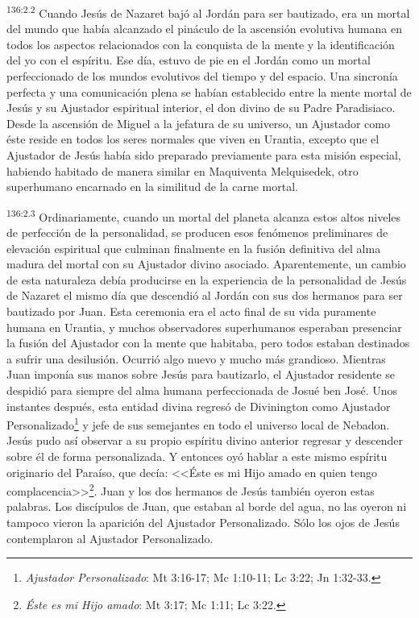 \par 
\textsuperscript{136:2.2} Cuando Jesús de Nazaret bajó al Jordán para ser bautizado, era un mortal del mundo que había alcanzado el pináculo de la ascensión evolutiva humana en todos los aspectos relacionados con la conquista de la mente y la identificación del yo con el espíritu. Ese día, estuvo de pie en el Jordán como un mortal perfeccionado de los mundos evolutivos del tiempo y del espacio. Una sincronía perfecta y una comunicación plena se habían establecido entre la mente mortal de Jesús y su Ajustador espiritual interior, el don divino de su Padre Paradisiaco. Desde la ascensión de Miguel a la jefatura de su universo, un Ajustador como éste reside en todos los seres normales que viven en Urantia, excepto que el Ajustador de Jesús había sido preparado previamente para esta misión especial, habiendo habitado de manera similar en Maquiventa Melquisedek, otro superhumano encarnado en la similitud de la carne mortal.

\par 
\textsuperscript{136:2.3} Ordinariamente, cuando un mortal del planeta alcanza estos altos niveles de perfección de la personalidad, se producen esos fenómenos preliminares de elevación espiritual que culminan finalmente en la fusión definitiva del alma madura del mortal con su Ajustador divino asociado. Aparentemente, un cambio de esta naturaleza debía producirse en la experiencia de la personalidad de Jesús de Nazaret el mismo día que descendió al Jordán con sus dos hermanos para ser bautizado por Juan. Esta ceremonia era el acto final de su vida puramente humana en Urantia, y muchos observadores superhumanos esperaban presenciar la fusión del Ajustador con la mente que habitaba, pero todos estaban destinados a sufrir una desilusión. Ocurrió algo nuevo y mucho más grandioso. Mientras Juan imponía sus manos sobre Jesús para bautizarlo, el Ajustador residente se despidió para siempre del alma humana perfeccionada de Josué ben José. Unos instantes después, esta entidad divina regresó de Divinington como Ajustador Personalizado\footnote{\textit{Ajustador Personalizado}: Mt 3:16-17; Mc 1:10-11; Lc 3:22; Jn 1:32-33.} y jefe de sus semejantes en todo el universo local de Nebadon. Jesús pudo así observar a su propio espíritu divino anterior regresar y descender sobre él de forma personalizada. Y entonces oyó hablar a este mismo espíritu originario del Paraíso, que decía: <<Éste es mi Hijo amado en quien tengo complacencia>>\footnote{\textit{Éste es mi Hijo amado}: Mt 3:17; Mc 1:11; Lc 3:22.}. Juan y los dos hermanos de Jesús también oyeron estas palabras. Los discípulos de Juan, que estaban al borde del agua, no las oyeron ni tampoco vieron la aparición del Ajustador Personalizado. Sólo los ojos de Jesús contemplaron al Ajustador Personalizado.


